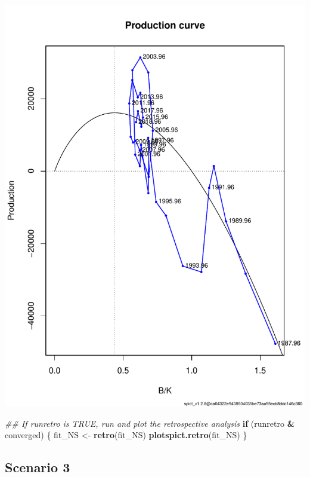 \documentclass[
]{article}
\newenvironment{Shaded}{\begin{snugshade}}{\end{snugshade}}
\newcommand{\CommentTok}[1]{\textcolor[rgb]{0.56,0.35,0.01}{\textit{#1}}}
\newcommand{\ControlFlowTok}[1]{\textcolor[rgb]{0.13,0.29,0.53}{\textbf{#1}}}
\newcommand{\KeywordTok}[1]{\textcolor[rgb]{0.13,0.29,0.53}{\textbf{#1}}}
\newcommand{\NormalTok}[1]{#1}
\newcommand{\OperatorTok}[1]{\textcolor[rgb]{0.81,0.36,0.00}{\textbf{#1}}}
\newcommand{\StringTok}[1]{\textcolor[rgb]{0.31,0.60,0.02}{#1}}
\begin{document}
\includegraphics{aru.27.123a4_SPiCT_WD_files/figure-latex/diagnostics_scenario_2-2.pdf}

\begin{Shaded}
\begin{Highlighting}[]
  \CommentTok{## If runretro is TRUE, run and plot the retrospective analysis}
  \ControlFlowTok{if}\NormalTok{ (runretro }\OperatorTok{&}\StringTok{ }\NormalTok{converged) \{}
\NormalTok{    fit_NS <-}\StringTok{ }\KeywordTok{retro}\NormalTok{(fit_NS)}
    \KeywordTok{plotspict.retro}\NormalTok{(fit_NS)}
\NormalTok{  \}}
\end{Highlighting}
\end{Shaded}

\hypertarget{scenario-3}{%
\subsection{Scenario 3}\label{scenario-3}}
\end{document}
